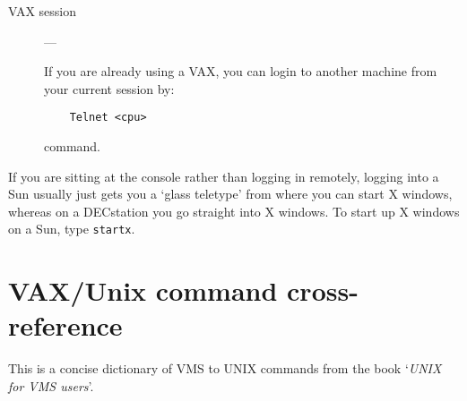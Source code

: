 \begin{description}
\begin{description}
\item [VAX session] ---

If you are already using a VAX, you can login to another machine from your
current session by:
\begin{verbatim}
    Telnet <cpu>
\end{verbatim}
command.

\end{description}
\end{description}

If you are sitting at the console rather than logging in remotely, logging into
a Sun usually just gets you a `glass teletype' from where you can start
X windows, whereas on a DECstation you go straight into X windows.
To start up X windows on a Sun, type {\tt startx}.

\newpage

\section{VAX/Unix command cross-reference}
\label{crosref}

This is a concise dictionary of VMS to UNIX commands from the book `{\em UNIX
for VMS users}'.

